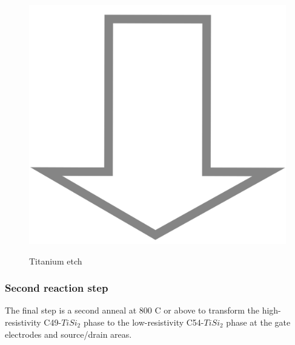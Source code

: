 \begin{figure}[H]
	\centering
	\begin{tikzpicture}[node distance = 3cm, auto, thick,scale=\CrossSectionOnly, every node/.style={transform shape}]
		
	\end{tikzpicture}\\
	\includegraphics[scale=0.01]{down_arrow.png}\\
	\begin{tikzpicture}[node distance = 3cm, auto, thick,scale=\CrossSectionOnly, every node/.style={transform shape}]
		
	\end{tikzpicture}
	\caption{Titanium etch}
\end{figure}

\subsubsection{Second reaction step}

The final step is a second anneal at 800 \degree C or above to transform the high-resistivity C49-$TiSi_2$ phase to the low-resistivity C54-$TiSi_2$ phase at the gate electrodes and source/drain areas.

